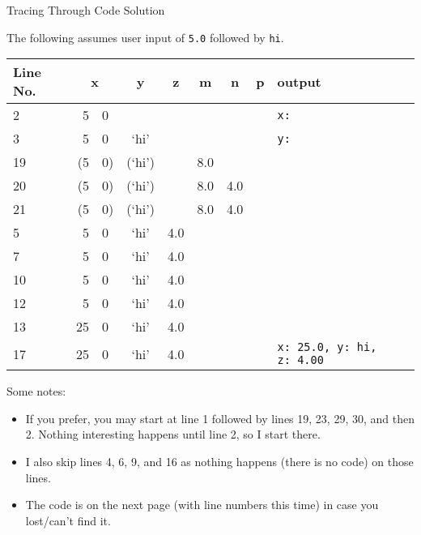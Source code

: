 \documentclass[12pt]{article}
\begin{document}
\begin{center}
   \LARGE Tracing Through Code Solution
\end{center}

The following assumes user input of \lstinline{5.0} followed by \lstinline{hi}.
\vspace{2ex}

\renewcommand{\arraystretch}{1.5}
\begin{tabular}{l r @{.} l c c c c c l}
   \toprule
   Line No. & \multicolumn{2}{c}{x} & y & z & m & n & p & output\\\midrule
   2  &  5&0  &&&&&& \texttt{x:\ }\\\midrule
   3  &  5&0  &  `hi'  &     &     &     && \texttt{y:\ }\\\midrule
   19 & (5&0) & (`hi') &     & 8.0 &     &&              \\\midrule
   20 & (5&0) & (`hi') &     & 8.0 & 4.0 &&              \\\midrule
   21 & (5&0) & (`hi') &     & 8.0 & 4.0 &&              \\\midrule
   5  &  5&0  &  `hi'  & 4.0 &     &     &&              \\\midrule
   7  &  5&0  &  `hi'  & 4.0 &     &     &&              \\\midrule
   10 &  5&0  &  `hi'  & 4.0 &     &     &&              \\\midrule
   12 &  5&0  &  `hi'  & 4.0 &     &     &&              \\\midrule
   13 & 25&0  &  `hi'  & 4.0 &     &     &&              \\\midrule
   17 & 25&0  &  `hi'  & 4.0 &     &     && \texttt{x:\ 25.0, y:\ hi, z:\ 4.00}\\
   \bottomrule
\end{tabular}
\vspace{2ex}

Some notes:
\begin{itemize}
   \item If you prefer, you may start at line 1 followed by lines 19, 23, 29,
      30, and then 2.  Nothing interesting happens until line 2, so I start
      there.
   \item I also skip lines 4, 6, 9, and 16 as nothing happens (there is no
      code) on those lines.
   \item The code is on the next page (with line numbers this time) in case you
      lost/can't find it.
\end{itemize}

\newpage


\end{document}
